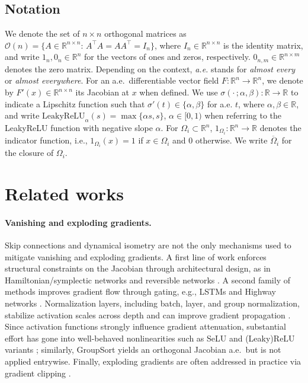 \documentclass{article}
\theoremstyle{plain}
\theoremstyle{definition}
\theoremstyle{definition}
\theoremstyle{remark}
\theoremstyle{definition}
\theoremstyle{definition}
\theoremstyle{remark}
\numberwithin{equation}{section}
\begin{document}
\subsection*{Notation}
We denote the set of $n\times n$ orthogonal matrices as $\mathcal{O}(n) =\{A\in\mathbb{R}^{n\times n}:\,A^\top A=AA^\top=I_n\}$, where $I_n\in\mathbb{R}^{n\times n}$ is the identity matrix, and write $1_n,0_n\in\mathbb{R}^n$ for the vectors of ones and zeros, respectively. $0_{n,m}\in\mathbb{R}^{n\times m}$ denotes the zero matrix. Depending on the context, \textit{a.e.} stands for \textit{almost every} or \textit{almost everywhere}. For an a.e.\, differentiable vector field $F:\mathbb{R}^n\to\mathbb{R}^n$, we denote by $F'(x)\in\mathbb{R}^{n\times n}$ its Jacobian at $x$ when defined. We use $\sigma(\cdot\,;\alpha,\beta):\mathbb{R}\to\mathbb{R}$ to indicate a Lipschitz function such that $\sigma'(t)\in\{\alpha,\beta\}$ for a.e. $t$, where $\alpha,\beta\in\mathbb{R}$, and write $\mathrm{LeakyReLU}_{\alpha}(s)=\max\{\alpha s,s\}$, $\alpha\in [0,1)$ when referring to the LeakyReLU function with negative slope $\alpha$. For $\Omega_i\subset\mathbb{R}^n$, $1_{\Omega_i}:\mathbb{R}^n\to\mathbb{R}$ denotes the indicator function, i.e., $1_{\Omega_i}(x)=1$ if $x\in\Omega_i$ and $0$ otherwise. We write $\overline{\Omega}_i$ for the closure of $\Omega_i$.

\section{Related works}

\paragraph{Vanishing and exploding gradients.} Skip connections and dynamical isometry are not the only mechanisms used to mitigate vanishing and exploding gradients. A first line of work enforces structural constraints on the Jacobian through architectural design, as in Hamiltonian/symplectic networks \cite{maslovskaya2024symplectic,galimberti2023hamiltonian,haber2017stable} and reversible networks \cite{unterthiner2016understanding}. A second family of methods improves gradient flow through gating, e.g., LSTMs \cite{hochreiter1997long} and Highway networks \cite{srivastava2015highway}. Normalization layers, including batch, layer, and group normalization, stabilize activation scales across depth and can improve gradient propagation \cite{ioffe2015batch,ba2016layer,wu2018group}. Since activation functions strongly influence gradient attenuation, substantial effort has gone into well-behaved nonlinearities such as SeLU \cite{klambauer2017self} and (Leaky)$\mathrm{ReLU}$ variants \cite{xu2015empirical,maas2013rectifier}; similarly, GroupSort \cite{anil2019sorting} yields an orthogonal Jacobian a.e.\, but is not applied entrywise. Finally, exploding gradients are often addressed in practice via gradient clipping \cite{pascanu2013difficulty}.
\end{document}
